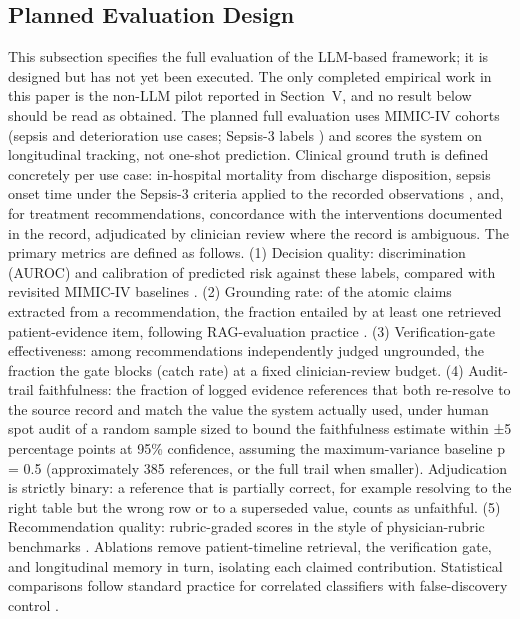 \subsection{Planned Evaluation Design}

This subsection specifies the full evaluation of the LLM-based framework; it is designed but
has not yet been executed. The only completed empirical work in this paper is the non-LLM
pilot reported in Section~V, and no result below should be read as obtained. The planned
full evaluation uses MIMIC-IV \cite{johnson2023mimic} cohorts (sepsis and deterioration use cases;
Sepsis-3 labels \cite{singer2016sepsis3,vincent1996sofa}) and scores the system on longitudinal
tracking, not one-shot prediction. Clinical ground truth is defined concretely per use case:
in-hospital mortality from discharge disposition, sepsis onset time under the Sepsis-3
criteria applied to the recorded observations \cite{singer2016sepsis3}, and, for treatment
recommendations, concordance with the interventions documented in the record, adjudicated by
clinician review where the record is ambiguous. The primary metrics are defined as follows.
(1) Decision quality: discrimination (AUROC) and calibration of predicted risk against these
labels, compared with revisited MIMIC-IV baselines \cite{lovon2025mimic}. (2) Grounding rate: of
the atomic claims extracted from a recommendation, the fraction entailed by at least one
retrieved patient-evidence item, following RAG-evaluation practice \cite{es2024ragas}. (3)
Verification-gate effectiveness: among recommendations independently judged ungrounded, the
fraction the gate blocks (catch rate) at a fixed clinician-review budget. (4) Audit-trail
faithfulness: the fraction of logged evidence references that both re-resolve to the source
record and match the value the system actually used, under human spot audit of a random
sample sized to bound the faithfulness estimate within ±5 percentage points at 95\%
confidence, assuming the maximum-variance baseline p = 0.5 (approximately 385 references, or
the full trail when smaller). Adjudication is strictly binary: a reference that is partially
correct, for example resolving to the right table but the wrong row or to a superseded
value, counts as unfaithful. (5)
Recommendation quality: rubric-graded scores in the style of physician-rubric benchmarks
\cite{arora2025healthbench,jiang2025medagentbench}. Ablations remove patient-timeline retrieval,
the verification gate, and longitudinal memory in turn, isolating each claimed contribution.
Statistical comparisons follow standard practice for correlated classifiers
\cite{delong1988comparing,dietterich1998approximate} with false-discovery control
\cite{benjamini1995controlling}.


